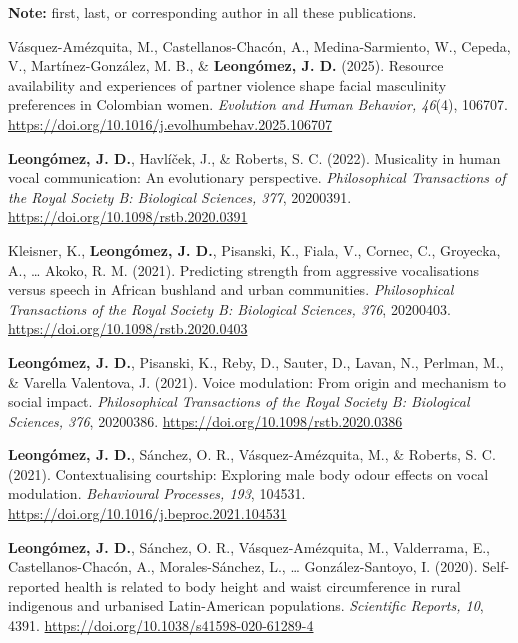 \documentclass[11pt,a4paper,]{awesome-cv}
\begin{document}
\begingroup
  \footnotesize

\begin{importantnote}
    \textbf{Note:} first, last, or corresponding author in all these publications.
  \end{importantnote}

\setlength{\parindent}{-0.5in} \setlength{\leftskip}{0.5in}

Vásquez-Amézquita, M., Castellanos-Chacón, A., Medina-Sarmiento, W.,
Cepeda, V., Martínez-González, M. B., \& \textbf{Leongómez, J. D.}
(2025). Resource availability and experiences of partner violence shape
facial masculinity preferences in Colombian women. \emph{Evolution and
Human Behavior, 46}(4), 106707.
\url{https://doi.org/10.1016/j.evolhumbehav.2025.106707}

\textbf{Leongómez, J. D.}, Havlíček, J., \& Roberts, S. C. (2022).
Musicality in human vocal communication: An evolutionary perspective.
\emph{Philosophical Transactions of the Royal Society B: Biological
Sciences, 377}, 20200391. \url{https://doi.org/10.1098/rstb.2020.0391}

Kleisner, K., \textbf{Leongómez, J. D.}, Pisanski, K., Fiala, V.,
Cornec, C., Groyecka, A., \ldots{} Akoko, R. M. (2021). Predicting
strength from aggressive vocalisations versus speech in African bushland
and urban communities. \emph{Philosophical Transactions of the Royal
Society B: Biological Sciences, 376}, 20200403.
\url{https://doi.org/10.1098/rstb.2020.0403}

\textbf{Leongómez, J. D.}, Pisanski, K., Reby, D., Sauter, D., Lavan,
N., Perlman, M., \& Varella Valentova, J. (2021). Voice modulation: From
origin and mechanism to social impact. \emph{Philosophical Transactions
of the Royal Society B: Biological Sciences, 376}, 20200386.
\url{https://doi.org/10.1098/rstb.2020.0386}

\textbf{Leongómez, J. D.}, Sánchez, O. R., Vásquez-Amézquita, M., \&
Roberts, S. C. (2021). Contextualising courtship: Exploring male body
odour effects on vocal modulation. \emph{Behavioural Processes, 193},
104531. \url{https://doi.org/10.1016/j.beproc.2021.104531}

\textbf{Leongómez, J. D.}, Sánchez, O. R., Vásquez-Amézquita, M.,
Valderrama, E., Castellanos-Chacón, A., Morales-Sánchez, L., \ldots{}
González-Santoyo, I. (2020). Self-reported health is related to body
height and waist circumference in rural indigenous and urbanised
Latin-American populations. \emph{Scientific Reports, 10}, 4391.
\url{https://doi.org/10.1038/s41598-020-61289-4}
\end{document}
